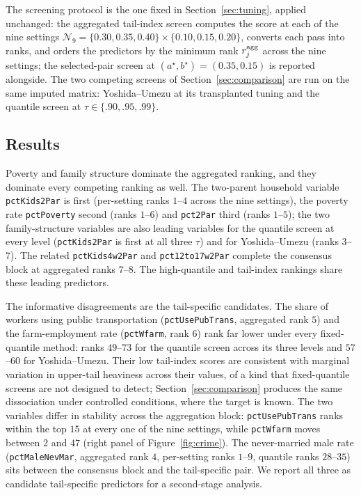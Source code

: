 The screening protocol is the one fixed in Section~\ref{sec:tuning},
applied unchanged: the aggregated tail-index screen computes the score
at each of the nine settings
$\mathcal N_9=\{0.30,0.35,0.40\}\times\{0.10,0.15,0.20\}$, converts
each pass into ranks, and orders the predictors by the minimum rank
$r_j^{\rm agg}$ across the nine settings; the selected-pair screen at
$(a^\star,b^\star)=(0.35,0.15)$ is reported alongside. The two
competing screens of Section~\ref{sec:comparison} are run on the same
imputed matrix: Yoshida--Umezu at its transplanted tuning and the
quantile screen at $\tau\in\{.90,.95,.99\}$.

\subsection{Results}

Poverty and family structure dominate the aggregated ranking, and they
dominate every competing ranking as well. The two-parent household
variable \texttt{pctKids2Par} is first (per-setting ranks $1$--$4$
across the nine settings), the poverty rate \texttt{pctPoverty} second
(ranks $1$--$6$) and \texttt{pct2Par} third (ranks $1$--$5$); the two
family-structure variables are also leading variables for the quantile
screen at every level (\texttt{pctKids2Par} is first at all three
$\tau$) and for Yoshida--Umezu (ranks $3$--$7$). The related
\texttt{pctKids4w2Par} and \texttt{pct12to17w2Par} complete the
consensus block at aggregated ranks $7$--$8$. The high-quantile and
tail-index rankings share these leading predictors.

The informative disagreements are the tail-specific candidates. The
share of workers using public transportation
(\texttt{pctUsePubTrans}, aggregated rank $5$) and the farm-employment
rate (\texttt{pctWfarm}, rank $6$) rank far lower under every
fixed-quantile method: ranks $49$--$73$ for the quantile screen across
its three levels and $57$--$60$ for Yoshida--Umezu. Their low
tail-index scores are consistent with marginal variation in upper-tail
heaviness across their values, of a kind that fixed-quantile screens are
not designed to detect; Section~\ref{sec:comparison} produces the same
dissociation under controlled conditions, where the target is known.
The two variables differ in stability across the aggregation block:
\texttt{pctUsePubTrans} ranks within the top $15$ at every one of the
nine settings, while \texttt{pctWfarm} moves between $2$ and $47$
(right panel of Figure~\ref{fig:crime}). The never-married male rate
(\texttt{pctMaleNevMar}, aggregated rank $4$, per-setting ranks
$1$--$9$, quantile ranks $28$--$35$) sits between the consensus block
and the tail-specific pair. We report all three as candidate
tail-specific predictors for a second-stage analysis.

